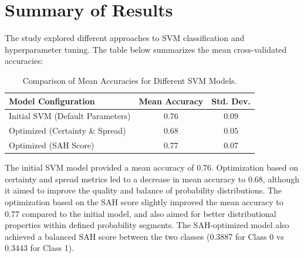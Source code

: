 \documentclass{article}
\begin{document}
\section{Summary of Results}
The study explored different approaches to SVM classification and hyperparameter tuning. The table below summarizes the mean cross-validated accuracies:

\begin{table}[htbp]
\centering
\caption{Comparison of Mean Accuracies for Different SVM Models.}
\begin{tabular}{lcc}
\toprule
Model Configuration & Mean Accuracy & Std. Dev. \\
\midrule
Initial SVM (Default Parameters) & $0.76$  & $0.09$  \\
Optimized (Certainty \& Spread) & $0.68$  & $0.05$  \\
Optimized (SAH Score) & $0.77$  & $0.07$  \\
\bottomrule
\end{tabular}
\label{tab:accuracy_summary}
\end{table}

The initial SVM model provided a mean accuracy of $0.76$. Optimization based on certainty and spread metrics led to a decrease in mean accuracy to $0.68$, although it aimed to improve the quality and balance of probability distributions. The optimization based on the SAH score slightly improved the mean accuracy to $0.77$ compared to the initial model, and also aimed for better distributional properties within defined probability segments. The SAH-optimized model also achieved a balanced SAH score between the two classes (0.3887 for Class 0 vs 0.3443 for Class 1).
\end{document}
